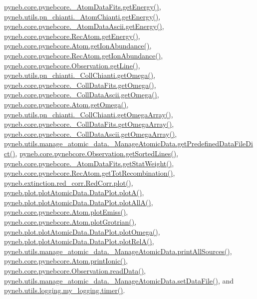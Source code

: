 \hyperlink{pynebcore_8py_source_l00268}{pyneb.\+core.\+pynebcore.\+\_\+\+Atom\+Data\+Fits.\+get\+Energy()}, \hyperlink{pn__chianti_8py_source_l00346}{pyneb.\+utils.\+pn\+\_\+chianti.\+\_\+\+Atom\+Chianti.\+get\+Energy()}, \hyperlink{pynebcore_8py_source_l00525}{pyneb.\+core.\+pynebcore.\+\_\+\+Atom\+Data\+Ascii.\+get\+Energy()}, \hyperlink{pynebcore_8py_source_l02811}{pyneb.\+core.\+pynebcore.\+Rec\+Atom.\+get\+Energy()}, \hyperlink{pynebcore_8py_source_l02110}{pyneb.\+core.\+pynebcore.\+Atom.\+get\+Ion\+Abundance()}, \hyperlink{pynebcore_8py_source_l02961}{pyneb.\+core.\+pynebcore.\+Rec\+Atom.\+get\+Ion\+Abundance()}, \hyperlink{pynebcore_8py_source_l03543}{pyneb.\+core.\+pynebcore.\+Observation.\+get\+Line()}, \hyperlink{pn__chianti_8py_source_l00484}{pyneb.\+utils.\+pn\+\_\+chianti.\+\_\+\+Coll\+Chianti.\+get\+Omega()}, \hyperlink{pynebcore_8py_source_l00811}{pyneb.\+core.\+pynebcore.\+\_\+\+Coll\+Data\+Fits.\+get\+Omega()}, \hyperlink{pynebcore_8py_source_l01063}{pyneb.\+core.\+pynebcore.\+\_\+\+Coll\+Data\+Ascii.\+get\+Omega()}, \hyperlink{pynebcore_8py_source_l01262}{pyneb.\+core.\+pynebcore.\+Atom.\+get\+Omega()}, \hyperlink{pn__chianti_8py_source_l00461}{pyneb.\+utils.\+pn\+\_\+chianti.\+\_\+\+Coll\+Chianti.\+get\+Omega\+Array()}, \hyperlink{pynebcore_8py_source_l00783}{pyneb.\+core.\+pynebcore.\+\_\+\+Coll\+Data\+Fits.\+get\+Omega\+Array()}, \hyperlink{pynebcore_8py_source_l01039}{pyneb.\+core.\+pynebcore.\+\_\+\+Coll\+Data\+Ascii.\+get\+Omega\+Array()}, \hyperlink{manage__atomic__data_8py_source_l00034}{pyneb.\+utils.\+manage\+\_\+atomic\+\_\+data.\+\_\+\+Manage\+Atomic\+Data.\+get\+Predefined\+Data\+File\+Dict()}, \hyperlink{pynebcore_8py_source_l03562}{pyneb.\+core.\+pynebcore.\+Observation.\+get\+Sorted\+Lines()}, \hyperlink{pynebcore_8py_source_l00242}{pyneb.\+core.\+pynebcore.\+\_\+\+Atom\+Data\+Fits.\+get\+Stat\+Weight()}, \hyperlink{pynebcore_8py_source_l02735}{pyneb.\+core.\+pynebcore.\+Rec\+Atom.\+get\+Tot\+Recombination()}, \hyperlink{red__corr_8py_source_l00303}{pyneb.\+extinction.\+red\+\_\+corr.\+Red\+Corr.\+plot()}, \hyperlink{plot_atomic_data_8py_source_l00116}{pyneb.\+plot.\+plot\+Atomic\+Data.\+Data\+Plot.\+plot\+A()}, \hyperlink{plot_atomic_data_8py_source_l00188}{pyneb.\+plot.\+plot\+Atomic\+Data.\+Data\+Plot.\+plot\+All\+A()}, \hyperlink{pynebcore_8py_source_l02313}{pyneb.\+core.\+pynebcore.\+Atom.\+plot\+Emiss()}, \hyperlink{pynebcore_8py_source_l02372}{pyneb.\+core.\+pynebcore.\+Atom.\+plot\+Grotrian()}, \hyperlink{plot_atomic_data_8py_source_l00372}{pyneb.\+plot.\+plot\+Atomic\+Data.\+Data\+Plot.\+plot\+Omega()}, \hyperlink{plot_atomic_data_8py_source_l00261}{pyneb.\+plot.\+plot\+Atomic\+Data.\+Data\+Plot.\+plot\+Rel\+A()}, \hyperlink{manage__atomic__data_8py_source_l00431}{pyneb.\+utils.\+manage\+\_\+atomic\+\_\+data.\+\_\+\+Manage\+Atomic\+Data.\+print\+All\+Sources()}, \hyperlink{pynebcore_8py_source_l02167}{pyneb.\+core.\+pynebcore.\+Atom.\+print\+Ionic()}, \hyperlink{pynebcore_8py_source_l03589}{pyneb.\+core.\+pynebcore.\+Observation.\+read\+Data()}, \hyperlink{manage__atomic__data_8py_source_l00380}{pyneb.\+utils.\+manage\+\_\+atomic\+\_\+data.\+\_\+\+Manage\+Atomic\+Data.\+set\+Data\+File()}, and \hyperlink{logging_8py_source_l00115}{pyneb.\+utils.\+logging.\+my\+\_\+logging.\+timer()}.

